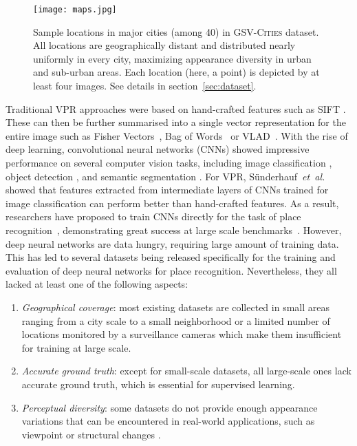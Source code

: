 \documentclass{article}
\newcommand{\etal}{\textit{et~al.}}
\begin{document}
\begin{figure*}[t]
\centering
\texttt{[image: maps.jpg]}
\caption{Sample locations in  major cities (among 40) in \textsc{GSV-Cities} dataset. All locations are geographically distant and distributed nearly uniformly in every city, maximizing appearance diversity in urban and sub-urban areas. Each location (here, a point) is depicted by at least four images. See details in section~\ref{sec:dataset}.}
\label{fig:geo_sample}
\end{figure*}

Traditional VPR approaches were based on hand-crafted features such as SIFT \cite{lowe2004distinctive}. These can then be further summarised into a single vector representation for the entire image such as Fisher Vectors~\cite{jegou2010aggregating, perronnin2010large}, Bag of Words~\cite{philbin2007object, torii2013visual, galvez2012bags} or VLAD~\cite{jegou2011aggregating,arandjelovic2013all}. With the rise of deep learning, convolutional neural networks (CNNs) \cite{lecun1989backpropagation} showed impressive performance on several computer vision tasks, including image classification \cite{he2016deep}, object detection \cite{liu2020deep}, and semantic segmentation \cite{lateef2019survey}.
For VPR, S\"underhauf~\etal~\cite{sunderhauf2015performance} showed that features extracted from intermediate layers of CNNs trained for image classification can perform better than hand-crafted features. As a result, researchers have proposed to train CNNs directly for the task of place recognition~\cite{zhang2021visual}, demonstrating great success at large scale benchmarks~\cite{torii2013visual, warburg2020mapillary}.
However, deep neural networks are data hungry, requiring large amount of training data. This has led to several datasets being released specifically for the training and evaluation of deep neural networks for place recognition. Nevertheless, they all lacked at least one of the following aspects:
\begin{enumerate}[label=(\roman*)]
    \item \textit{Geographical coverage}: most existing datasets are collected in small areas ranging from a city scale \cite{maddern20171} to a small neighborhood \cite{geiger2013vision} or a limited number of locations monitored by a surveillance cameras \cite{chen2017deep} which make them insufficient for training at large scale.
    \item \textit{Accurate ground truth}: except for small-scale datasets, all large-scale ones lack accurate ground truth, which is essential for supervised learning.
    \item \textit{Perceptual diversity}: some datasets do not provide enough appearance variations that can be encountered in real-world applications, such as viewpoint \cite{chen2017deep} or structural changes \cite{olid2018single}.
\end{enumerate}
\end{document}
